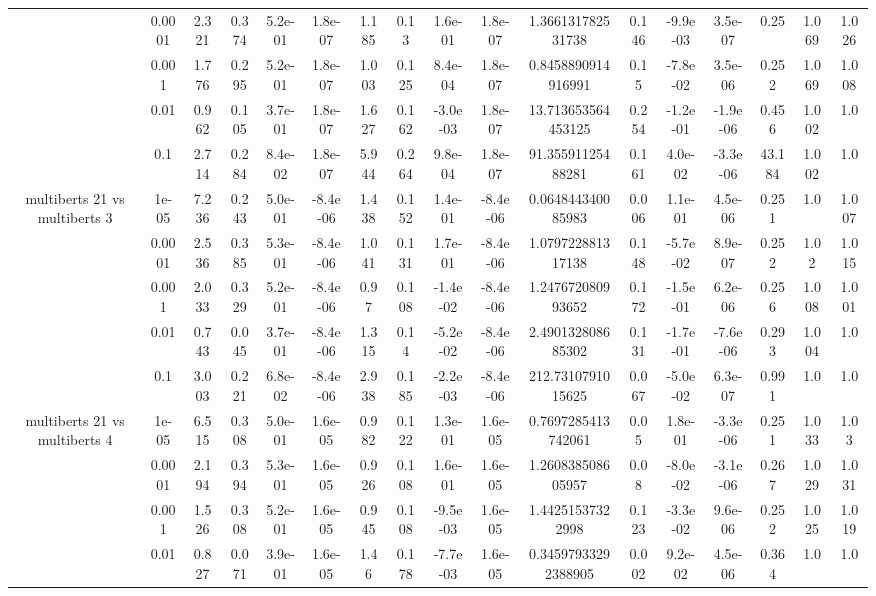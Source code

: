 \begin{tabular}{|c|c|c|c|c|c|c|c|c|c|c|c|c|c|c|c|c|}
 & 0.0001 & 2.321 & 0.374 & 5.2e-01 & 1.8e-07 & 1.185 & 0.13 & 1.6e-01 & 1.8e-07 & 1.366131782531738 & 0.146 & -9.9e-03 & 3.5e-07 & 0.25 & 1.069 & 1.026 \\
 & 0.001 & 1.776 & 0.295 & 5.2e-01 & 1.8e-07 & 1.003 & 0.125 & 8.4e-04 & 1.8e-07 & 0.8458890914916991 & 0.15 & -7.8e-02 & 3.5e-06 & 0.252 & 1.069 & 1.008 \\
 & 0.01 & 0.962 & 0.105 & 3.7e-01 & 1.8e-07 & 1.627 & 0.162 & -3.0e-03 & 1.8e-07 & 13.713653564453125 & 0.254 & -1.2e-01 & -1.9e-06 & 0.456 & 1.002 & 1.0 \\
 & 0.1 & 2.714 & 0.284 & 8.4e-02 & 1.8e-07 & 5.944 & 0.264 & 9.8e-04 & 1.8e-07 & 91.35591125488281 & 0.161 & 4.0e-02 & -3.3e-06 & 43.184 & 1.002 & 1.0 \\
\hline
\multirow{5}{*}{multiberts 21 vs multiberts 3} & 1e-05 & 7.236 & 0.243 & 5.0e-01 & -8.4e-06 & 1.438 & 0.152 & 1.4e-01 & -8.4e-06 & 0.064844340085983 & 0.006 & 1.1e-01 & 4.5e-06 & 0.251 & 1.0 & 1.007 \\
 & 0.0001 & 2.536 & 0.385 & 5.3e-01 & -8.4e-06 & 1.041 & 0.131 & 1.7e-01 & -8.4e-06 & 1.079722881317138 & 0.148 & -5.7e-02 & 8.9e-07 & 0.252 & 1.02 & 1.015 \\
 & 0.001 & 2.033 & 0.329 & 5.2e-01 & -8.4e-06 & 0.97 & 0.108 & -1.4e-02 & -8.4e-06 & 1.247672080993652 & 0.172 & -1.5e-01 & 6.2e-06 & 0.256 & 1.008 & 1.001 \\
 & 0.01 & 0.743 & 0.045 & 3.7e-01 & -8.4e-06 & 1.315 & 0.14 & -5.2e-02 & -8.4e-06 & 2.490132808685302 & 0.131 & -1.7e-01 & -7.6e-06 & 0.293 & 1.004 & 1.0 \\
 & 0.1 & 3.003 & 0.221 & 6.8e-02 & -8.4e-06 & 2.938 & 0.185 & -2.2e-03 & -8.4e-06 & 212.7310791015625 & 0.067 & -5.0e-02 & 6.3e-07 & 0.991 & 1.0 & 1.0 \\
\hline
\multirow{5}{*}{multiberts 21 vs multiberts 4} & 1e-05 & 6.515 & 0.308 & 5.0e-01 & 1.6e-05 & 0.982 & 0.122 & 1.3e-01 & 1.6e-05 & 0.7697285413742061 & 0.05 & 1.8e-01 & -3.3e-06 & 0.251 & 1.033 & 1.03 \\
 & 0.0001 & 2.194 & 0.394 & 5.3e-01 & 1.6e-05 & 0.926 & 0.108 & 1.6e-01 & 1.6e-05 & 1.260838508605957 & 0.08 & -8.0e-02 & -3.1e-06 & 0.267 & 1.029 & 1.031 \\
 & 0.001 & 1.526 & 0.308 & 5.2e-01 & 1.6e-05 & 0.945 & 0.108 & -9.5e-03 & 1.6e-05 & 1.44251537322998 & 0.123 & -3.3e-02 & 9.6e-06 & 0.252 & 1.025 & 1.019 \\
 & 0.01 & 0.827 & 0.071 & 3.9e-01 & 1.6e-05 & 1.46 & 0.178 & -7.7e-03 & 1.6e-05 & 0.34597933292388905 & 0.002 & 9.2e-02 & 4.5e-06 & 0.364 & 1.0 & 1.0 \\

\end{tabular}
